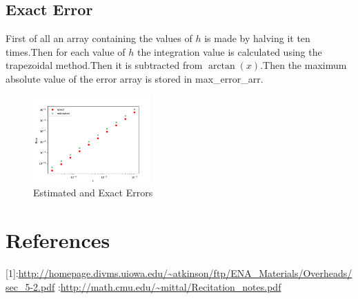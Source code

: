 \documentclass[11pt, a3paper, twocolumn]{article}
\begin{document}
\subsection{Exact Error}
First of all an array containing the values of $h$ is made by halving it ten times.Then for each value of $h$ the integration value is calculated using the trapezoidal method.Then it is subtracted from $\arctan(x)$.Then the maximum absolute value of the error array is stored in 
{\selectfont max\_error\_arr}.
\begin{figure}[h!]
  \includegraphics[width=0.4\textwidth, right]{Fig5.png}
  \caption{Estimated and Exact Errors}
\end{figure}

\section{References}
[1]:\url{http://homepage.divms.uiowa.edu/~atkinson/ftp/ENA_Materials/Overheads/sec_5-2.pdf}
\newline[2]:\url{http://math.cmu.edu/~mittal/Recitation_notes.pdf}
\end{document}
